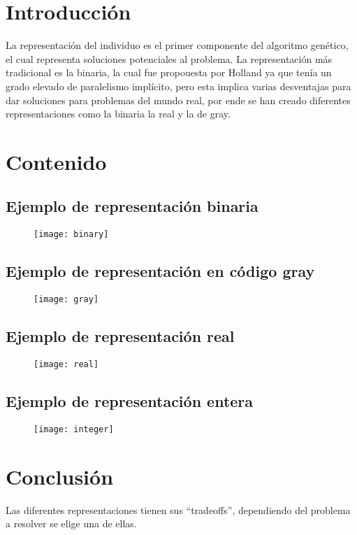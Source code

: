 \documentclass{article}
\begin{document}
\maketitle
\tableofcontents
\section{Introducción}
La representación del individuo es el primer componente del algoritmo genético, el cual representa soluciones potenciales al problema. La representación más tradicional es la binaria, la cual fue propouesta por Holland ya que tenía un grado elevado de paralelismo implícito, pero esta implica varias desventajas para dar soluciones para problemas del mundo real, por ende se han creado diferentes representaciones como la binaria la real y la de gray.
\section{Contenido}
\subsection{Ejemplo de representación binaria}
\begin{figure}[h!]
	\centering
	\texttt{[image: binary]}
\end{figure}
\newpage
\subsection{Ejemplo de representación en código gray}
\begin{figure}[h!]
	\centering
	\texttt{[image: gray]}
\end{figure}
\subsection{Ejemplo de representación real}
\begin{figure}[h!]
	\centering
	\texttt{[image: real]}
\end{figure}
\subsection{Ejemplo de representación entera}
\begin{figure}[h!]
	\centering
	\texttt{[image: integer]}
\end{figure}
\section{Conclusión}
Las diferentes representaciones tienen sus ``tradeoffs'', dependiendo del problema a resolver se elige una de ellas.
\end{document}
